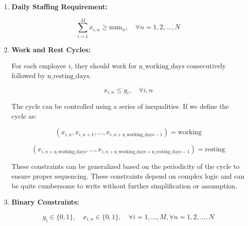 \documentclass{article}
\begin{document}
\begin{enumerate}
    \item \textbf{Daily Staffing Requirement:}

    \[
    \sum_{i=1}^{M} x_{i,n} \geq \text{num}_n, \quad \forall n = 1, 2, \ldots, N
    \]

    \item \textbf{Work and Rest Cycles:}

    For each employee \( i \), they should work for \(\text{n\_working\_days}\) consecutively followed by \(\text{n\_resting\_days}\).

    \[
    x_{i,n} \leq y_i, \quad \forall i, n
    \]

    The cycle can be controlled using a series of inequalities. If we define the cycle as:

    \[
    \left(x_{i,n}, x_{i,n+1}, \ldots, x_{i,n+\text{n\_working\_days}-1}\right) = \text{working}
    \]

    \[
    \left(x_{i,n+\text{n\_working\_days}}, \ldots, x_{i,n+\text{n\_working\_days}+\text{n\_resting\_days}-1}\right) = \text{resting}
    \]

    These constraints can be generalized based on the periodicity of the cycle to ensure proper sequencing. These constraints depend on complex logic and can be quite cumbersome to write without further simplification or assumption.

    \item \textbf{Binary Constraints:}

    \[
    y_i \in \{0,1\}, \quad x_{i,n} \in \{0,1\}, \quad \forall i = 1,\ldots,M, \forall n = 1,2,\ldots,N
    \]
\end{enumerate}
\end{document}
